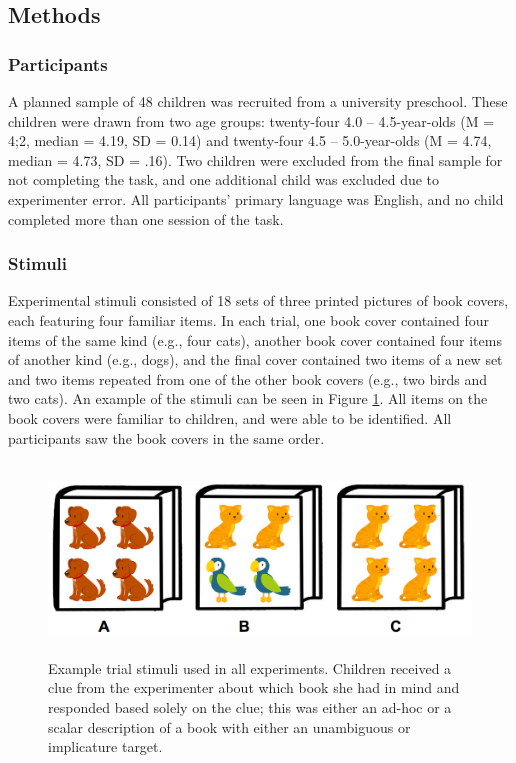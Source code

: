 \documentclass[man]{apa2}
\begin{document}

\subsection{Methods}

\subsubsection{Participants} A planned sample of 48 children was recruited from a university preschool. These children were drawn from two age groups: twenty-four 4.0 -- 4.5-year-olds (M = 4;2, median = 4.19, SD = 0.14) and twenty-four 4.5 -- 5.0-year-olds (M = 4.74, median = 4.73, SD = .16). Two children were excluded from the final sample for not completing the task, and one additional child was excluded due to experimenter error. All participants' primary language was English, and no child completed more than one session of the task. 

\subsubsection{Stimuli}
Experimental stimuli consisted of 18 sets of three printed pictures of book covers, each featuring four familiar items. In each trial, one book cover contained four items of the same kind (e.g., four cats), another book cover contained four items of another kind (e.g., dogs), and the final cover contained two items of a new set and two items repeated from one of the other book covers (e.g., two birds and two cats). An example of the stimuli can be seen in Figure \ref{fig:demo}. All items on the book covers were familiar to children, and were able to be identified. All participants saw the book covers in the same order. 

\begin{figure}
 \begin{center} 
  \includegraphics[height=2in]{figures/implicatures_demo_letters.png}
  \caption{\label{fig:demo} Example trial stimuli used in all experiments. Children received a clue from the experimenter about which book she had in mind and responded based solely on the clue; this was either an ad-hoc or a scalar description of a book with either an unambiguous or implicature target.} 
 \end{center} 
\end{figure}
\end{document}
